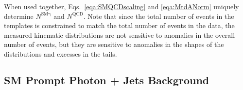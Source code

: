 When used together, Eqs.~\ref{eqa:SMQCDscaling} and \ref{eqa:MtdANorm} uniquely determine $N^\mathrm{SM\gamma}$ and $N^\mathrm{QCD}$. Note that since the total number of events in the templates is constrained to match the total number of events in the data, the measured kinematic distributions are not sensitive to anomalies in the overall number of \phojets events, but they are sensitive to anomalies in the shapes of the distributions and excesses in the tails.


\subsection{SM Prompt Photon + Jets Background}\label{sec:SMpromptPhotonJets}

\begin{figure}[p]
\begin{center}
\end{center}
\end{figure}

